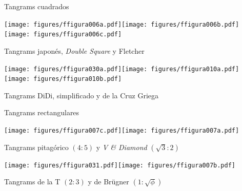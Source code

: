 \documentclass[14pt,aspectratio=169,usenames,dvipsnames]{beamer}
\begin{document}
    \begin{frame}{Tangrams cuadrados}
        \begin{center}
            \texttt{[image: figures/ffigura006a.pdf]}\qquad\texttt{[image: figures/ffigura006b.pdf]}\qquad\texttt{[image: figures/ffigura006c.pdf]}\\

            \bigskip

            Tangrams japonés, \emph{Double Square} y Fletcher

            \bigskip

            \texttt{[image: figures/ffigura030a.pdf]}\qquad\texttt{[image: figures/ffigura010a.pdf]}\qquad\texttt{[image: figures/ffigura010b.pdf]}\\

            \bigskip

             Tangrams DiDi, simplificado y de la Cruz Griega
        \end{center}
    \end{frame}


    \begin{frame}{Tangrams rectangulares}
        \begin{center}
            \texttt{[image: figures/ffigura007c.pdf]}\qquad\quad\texttt{[image: figures/ffigura007a.pdf]}\;\;\phantom{.} \\

            \bigskip

            Tangrams pitagórico $(4\!\!:\!\!5)$ y \emph{V \& Diamond} $(\sqrt{3}\!\!:\!\!2)$\\

            \bigskip

            \texttt{[image: figures/ffigura031.pdf]}\qquad\texttt{[image: figures/ffigura007b.pdf]}\;\;\phantom{.}\\

            \bigskip

            Tangrams de la T $(2\!\!:\!\!3)$ y de Brügner $(1\!\!:\!\!\sqrt{\phi})$\\
        \end{center}
    \end{frame}

\end{document}
